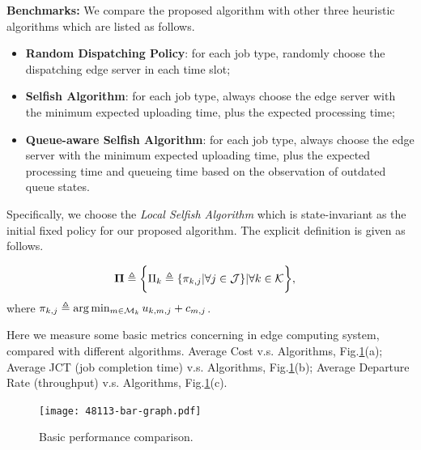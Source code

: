 \textbf{Benchmarks:}
We compare the proposed algorithm with other three heuristic algorithms which are listed as follows.
\begin{itemize}
    \item \textbf{Random Dispatching Policy}:
            for each job type, randomly choose the dispatching edge server in each time slot; 
    \item \textbf{Selfish Algorithm}:
            for each job type, always choose the edge server with the minimum expected uploading time, plus the expected processing time;
    \item \textbf{Queue-aware Selfish Algorithm}:
            for each job type, always choose the edge server with the minimum expected uploading time, plus the expected processing time and queueing time based on the observation of outdated queue states.
\end{itemize}
Specifically, we choose the \emph{Local Selfish Algorithm} which is state-invariant as the initial fixed policy for our proposed algorithm.
The explicit definition is given as follows.
\begin{policy}
    \begin{align}
        \boldsymbol{\Pi} &\triangleq \bigg\{ \Pi_{k}\triangleq\{\pi_{k,j}|\forall j\in\mathcal{J}\} |\forall k\in\mathcal{K} \bigg\},
    \end{align}
    where $\pi_{k,j} \triangleq \arg\min_{m\in\mathcal{M}_{k}} u_{k,m,j} + c_{m,j}$.
\end{policy}

Here we measure some basic metrics concerning in edge computing system, compared with different algorithms.
Average Cost v.s. Algorithms, Fig.\ref{fig:bar_plot}(a);
Average JCT (job completion time) v.s. Algorithms, Fig.\ref{fig:bar_plot}(b);
Average Departure Rate (throughput) v.s. Algorithms, Fig.\ref{fig:bar_plot}(c).

\begin{figure}[h]                                                       %
    \centering                                                          %
    \texttt{[image: 48113-bar-graph.pdf]}         %
    \caption{Basic performance comparison.}                             %
    \label{fig:bar_plot}                                                %
\end{figure}                                                            %

